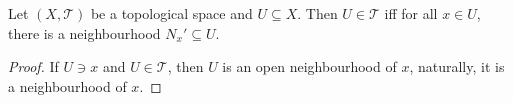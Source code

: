 \begin{lemma}
	Let $(X, \mathcal T)$ be a topological space and $U \subseteq X$. Then $U \in \mathcal T$ iff for all $x \in U$, there is a neighbourhood $N_x' \subseteq U$.
\end{lemma}


\begin{proof}
	If $U \ni x$ and $U \in \mathcal T$, then $U$ is an open neighbourhood of $x$, naturally, it is a neighbourhood of $x$.
\end{proof}









































%
